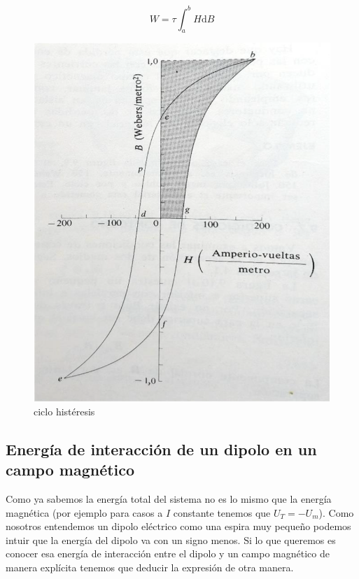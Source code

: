 \documentclass[12pt,a4paper]{article}
\newcommand{\D}{\mathrm{d}}
\begin{document}
\begin{equation}
W = \tau \int_a^b H \D B
\end{equation}




\begin{figure}[h!]
    \centering
    \includegraphics[scale=0.5]{histeresis.png}
    \caption{ciclo histéresis}
\end{figure}

\subsection{Energía de interacción de un dipolo en un campo magnético}

Como ya sabemos la energía total del sistema no es lo mismo que la energía magnética (por ejemplo para casos a $I$ constante tenemos que $U_T = - U_m$). Como nosotros entendemos un dipolo eléctrico como una espira muy pequeño podemos intuir que la energía del dipolo va con un signo menos. Si lo que queremos es conocer esa energía de interacción entre el dipolo y un campo magnético de manera explícita tenemos que deducir la expresión de otra manera. \\
\end{document}
